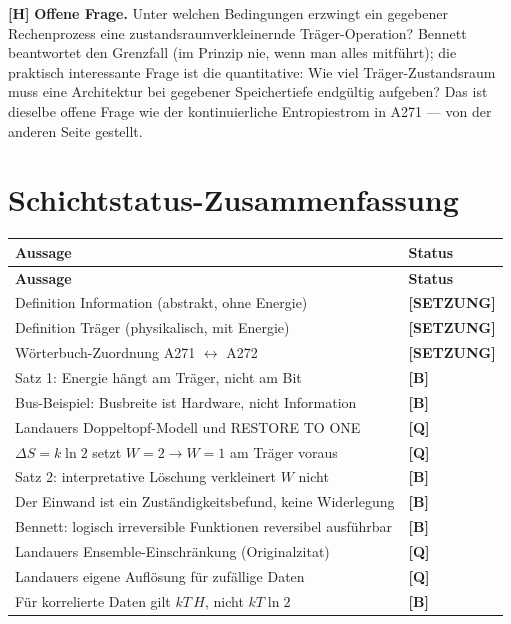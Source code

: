 \textbf{[H]} \textbf{Offene Frage.} Unter welchen Bedingungen erzwingt ein gegebener
Rechenprozess eine zustandsraumverkleinernde Träger-Operation? Bennett beantwortet
den Grenzfall (im Prinzip nie, wenn man alles mitführt); die praktisch
interessante Frage ist die quantitative: Wie viel Träger-Zustandsraum muss eine
Architektur bei gegebener Speichertiefe endgültig aufgeben? Das ist dieselbe
offene Frage wie der kontinuierliche Entropiestrom in A271 --- von der anderen
Seite gestellt.

\section{Schichtstatus-Zusammenfassung}

\begin{center}
\small
\begin{longtable}{@{}p{}l@{}}
\toprule
\textbf{Aussage} & \textbf{Status} \\
\midrule
\endfirsthead
\toprule
\textbf{Aussage} & \textbf{Status} \\
\midrule
\endhead
Definition Information (abstrakt, ohne Energie) & \textbf{[SETZUNG]} \\
Definition Träger (physikalisch, mit Energie) & \textbf{[SETZUNG]} \\
Wörterbuch-Zuordnung A271 $\leftrightarrow$ A272 & \textbf{[SETZUNG]} \\
Satz 1: Energie hängt am Träger, nicht am Bit & \textbf{[B]} \\
Bus-Beispiel: Busbreite ist Hardware, nicht Information & \textbf{[B]} \\
Landauers Doppeltopf-Modell und \textup{RESTORE TO ONE} & \textbf{[Q]} \\
$\Delta S = k\ln 2$ setzt $W{=}2 \to W{=}1$ am Träger voraus & \textbf{[Q]} \\
Satz 2: interpretative Löschung verkleinert $W$ nicht & \textbf{[B]} \\
Der Einwand ist ein Zuständigkeitsbefund, keine Widerlegung & \textbf{[B]} \\
Bennett: logisch irreversible Funktionen reversibel ausführbar & \textbf{[B]} \\
Landauers Ensemble-Einschränkung (Originalzitat) & \textbf{[Q]} \\
Landauers eigene Auflösung für zufällige Daten & \textbf{[Q]} \\
Für korrelierte Daten gilt $kT\,H$, nicht $kT\ln 2$ & \textbf{[B]} \\

\end{longtable}
\end{center}
